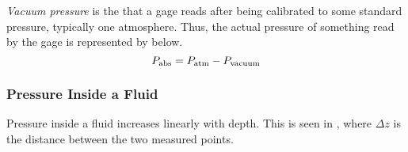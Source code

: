 \begin{definition}\label{def:Vacuum_Pressure}
  \emph{Vacuum pressure} is the  that a gage reads after being calibrated to some standard pressure, typically one atmosphere.
  Thus, the actual pressure of something read by the gage is represented by  below.
  \begin{equation}\label{eq:Vacuum_Pressure}
    P_{\mathrm{abs}} = P_{\mathrm{atm}} - P_{\mathrm{vacuum}}
  \end{equation}
\end{definition}

\subsubsection{Pressure Inside a Fluid}\label{subsubsec:Pressure_Inside_Fluid}
Pressure inside a fluid increases linearly with depth.
This is seen in , where $\Delta z$ is the distance between the two measured points.


